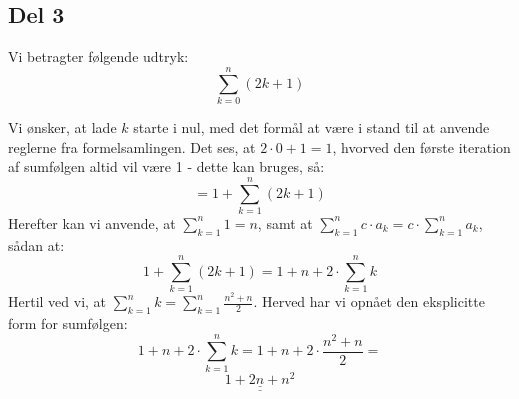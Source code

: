 \documentclass[11pt,a4paper,final]{article}
\begin{document}
\subsection*{Del 3}

Vi betragter følgende udtryk: 
$$
\sum_{k=0}^{n} (2k+1)
$$

Vi ønsker, at lade $k$ starte i nul, med det formål at være i stand til at anvende reglerne fra formelsamlingen. Det ses, at $2\cdot0+1 = 1$, hvorved den første iteration af sumfølgen altid vil være 1 - dette kan bruges, så:
$$
= 1 + \sum_{k=1}^{n} (2k+1)
$$
Herefter kan vi anvende, at $\sum_{k=1}^{n} 1 = n$, samt at $\sum_{k=1}^{n}c \cdot a_{k} = c \cdot \sum_{k=1}^{n}a_{k}$, sådan at:
$$
1 + \sum_{k=1}^{n} (2k+1) = 1 + n + 2 \cdot \sum_{k=1}^{n}k
$$
Hertil ved vi, at $\sum_{k=1}^{n}k = \sum_{k=1}^{n}\frac{n^{2}+n}{2}$. Herved har vi opnået den eksplicitte form for sumfølgen:
$$
1 + n + 2 \cdot \sum_{k=1}^{n}k = 1 + n + 2 \cdot \frac{n^{2}+n}{2} = 
$$
$$
\underline{\underline{1 + 2n + n^{2}}}
$$
\end{document}

